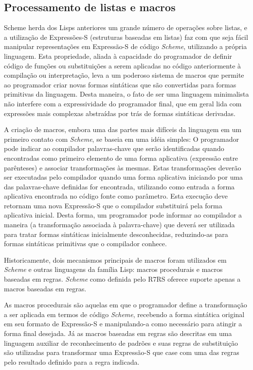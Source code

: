 \subsection{Processamento de listas e macros}

Scheme herda dos Lisps anteriores um grande número de operações sobre listas, e
a utilização de Expressões-S (estruturas baseadas em listas) faz com que seja
fácil manipular representações em Expressão-S de código \textit{Scheme},
utilizando a própria linguagem. Esta propriedade, aliada à capacidade do
programador de definir código de funções ou substituições a serem aplicadas no
código anteriormente à compilação ou interpretação, leva a um poderoso sistema
de macros que permite ao programador criar novas formas sintáticas que são
convertidas para formas primitivas da linguagem. Desta maneira, o fato de ser
uma linguagem minimalista não interfere com a expressividade do programador
final, que em geral lida com expressões mais complexas abstraídas por trás de
formas sintáticas derivadas.

A criação de macros, embora uma das partes mais difíceis da linguagem em um
primeiro contato com \textit{Scheme}, se baseia em uma idéia simples: O
programador pode indicar ao compilador palavras-chave que serão identificadas
quando encontradas como primeiro elemento de uma forma aplicativa (expressão
entre parênteses) e associar transformações às mesmas. Estas transformações
deverão ser executadas pelo compilador quando uma forma aplicativa iniciando
por uma das palavras-chave definidas for encontrada, utilizando como entrada a
forma aplicativa encontrada no código fonte como parâmetro. Esta execução deve
retornam uma nova Expressão-S que o compilador substituirá pela forma
aplicativa inicial.  Desta forma, um programador pode informar ao compilador a
maneira (a transformação associada à palavra-chave) que deverá ser utilizada
para tratar formas sintáticas inicialmente desconhecidas, reduzindo-as para
formas sintáticas primitivas que o compilador conhece.

Historicamente, dois mecanismos principais de macros foram utilizados em
\textit{Scheme} e outras linguagens da família Lisp: macros procedurais e
macros baseadas em regras. \textit{Scheme} como definida pelo \acs{R7RS}
oferece suporte apenas a macros baseadas em regras.

As macros procedurais são aquelas em que o programador define a transformação a
ser aplicada em termos de código \textit{Scheme}, recebendo a forma sintática
original em seu formato de Expressão-S e manipulando-a como necessário para
atingir a forma final desejada. Já as macros baseadas em regras são descritas
em uma linguagem auxiliar de reconhecimento de padrões e suas regras de
substituição são utilizadas para transformar uma Expressão-S que case com uma
das regras pelo resultado definido para a regra indicada. 

